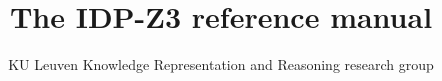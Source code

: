 \documentclass[a4paper]{article}
\title{The IDP-Z3 reference manual}
\author{KU Leuven Knowledge Representation and Reasoning research group}
\begin{document}
\maketitle


\renewcommand{\todo}[1]{}                        %

 
\newpage
\tableofcontents

\newpage

\todo{everywhere in the text, replace dollar signs and \code{\{ tt ... \}} by \code{code \{ ... \}}}



%

%

%

%

%

%

%

%

%

%

%

%
\end{document}
